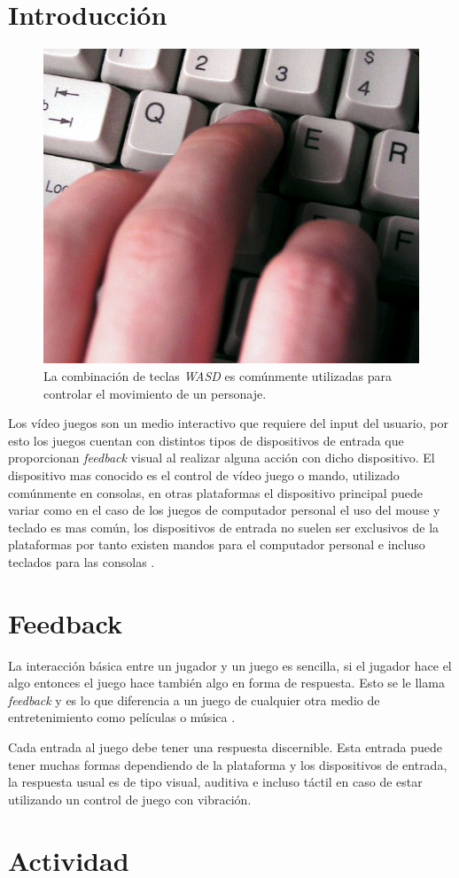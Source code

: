 \section{Introducción}
\setlength\intextsep{0pt}
\begin{figure}
\includegraphics[width=\linewidth]{semana4/wasd.jpg}
\caption{La combinación de teclas \emph{WASD} es comúnmente utilizadas para controlar el movimiento de un personaje.}
\label{fig:wasd}
\end{figure}
Los vídeo juegos son un medio interactivo que requiere del input del usuario, por esto los juegos cuentan con distintos tipos de dispositivos de entrada que proporcionan \emph{feedback} visual al realizar alguna acción con dicho dispositivo. El dispositivo mas conocido es el control de vídeo juego o mando, utilizado comúnmente en consolas, en otras plataformas el dispositivo principal puede variar como en el caso de los juegos de computador personal el uso del mouse y teclado es mas común, los dispositivos de entrada no suelen ser exclusivos de la plataformas por tanto existen mandos para el computador personal e incluso teclados para las consolas \cite[p.~395]{jenkinscreatinggames}.
\section{Feedback}
La interacción básica entre un jugador y un juego es sencilla, si el jugador hace el algo entonces el juego hace también algo en forma de respuesta. Esto se le llama \emph{feedback} y es lo que diferencia a un juego de cualquier otra medio de entretenimiento como películas o música \cite[p.~18]{bobbatesgamedesign}.

Cada entrada al juego debe tener una respuesta discernible. Esta entrada puede tener muchas formas dependiendo de la plataforma y los dispositivos de entrada, la respuesta usual es de tipo visual, auditiva e incluso táctil en caso de estar utilizando un control de juego con vibración.

\section{Actividad}

